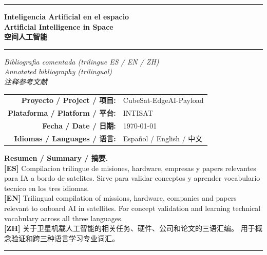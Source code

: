 \documentclass[11pt,a4paper]{report}
\begin{document}
\begin{titlepage}
\centering
\vspace*{1cm}
{\color{intisat}\rule{\textwidth}{2pt}}
\vspace{0.6cm}

{\Huge\bfseries\color{intisat} Inteligencia Artificial en el espacio}\\[0.3em]
{\LARGE\bfseries\color{intisat} Artificial Intelligence in Space}\\[0.3em]
{\LARGE\bfseries\color{intisat} 空间人工智能}

\vspace{0.6cm}
{\color{intisataccent}\rule{0.6\textwidth}{1pt}}
\vspace{0.6cm}

{\Large\itshape Bibliografia comentada (trilingue ES / EN / ZH)\\
Annotated bibliography (trilingual)\\
注释参考文献}

\vspace{1cm}

\begin{tabular}{rl}
\textbf{Proyecto / Project / 项目:} & CubeSat-EdgeAI-Payload \\
\textbf{Plataforma / Platform / 平台:} & INTISAT \\
\textbf{Fecha / Date / 日期:} & \today \\
\textbf{Idiomas / Languages / 语言:} & Español / English / 中文 \\
\end{tabular}

\vfill

\begin{minipage}{0.85\textwidth}
\textbf{Resumen / Summary / 摘要.}\\[0.3em]
\textbf{[ES]} Compilacion trilingue de misiones, hardware, empresas y
papers relevantes para IA a bordo de satelites. Sirve para validar
conceptos y aprender vocabulario tecnico en los tres idiomas.\\[0.3em]
\textbf{[EN]} Trilingual compilation of missions, hardware, companies and
papers relevant to onboard AI in satellites. For concept validation and
learning technical vocabulary across all three languages.\\[0.3em]
\textbf{[ZH]} 关于卫星机载人工智能的相关任务、硬件、公司和论文的三语汇编。
用于概念验证和跨三种语言学习专业词汇。
\end{minipage}

\vspace{1cm}
{\color{intisat}\rule{\textwidth}{2pt}}
\end{titlepage}
\end{document}
